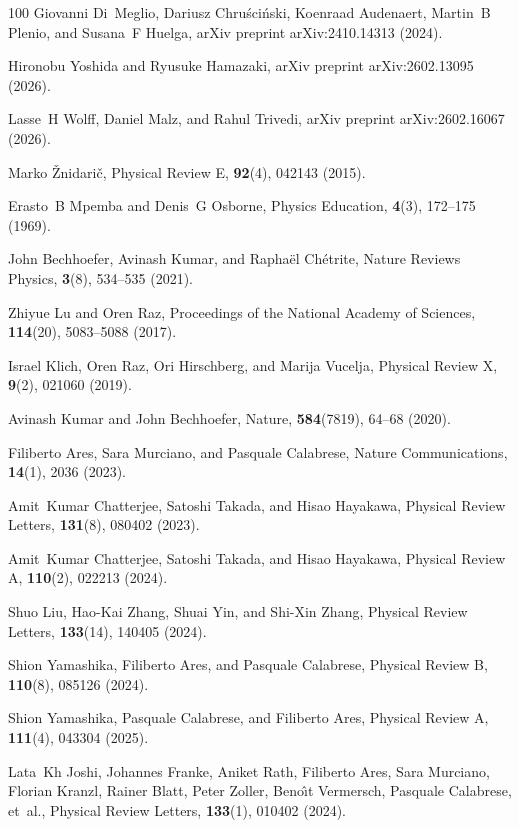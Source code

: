 \documentclass[preprint,pteplogo]{ptephy_v2}%
\numberwithin{equation}{section}
\theoremstyle{definition}
\begin{document}
\begin{thebibliography}{100}
Giovanni Di~Meglio, Dariusz Chru{\'s}ci{\'n}ski, Koenraad Audenaert, Martin~B Plenio, and Susana~F Huelga, arXiv preprint arXiv:2410.14313 (2024).

Hironobu Yoshida and Ryusuke Hamazaki, arXiv preprint arXiv:2602.13095 (2026).

Lasse~H Wolff, Daniel Malz, and Rahul Trivedi, arXiv preprint arXiv:2602.16067 (2026).

Marko {\v{Z}}nidari{\v{c}}, Physical Review E, {\bf 92}(4), 042143 (2015).

Erasto~B Mpemba and Denis~G Osborne, Physics Education, {\bf 4}(3), 172--175 (1969).

John Bechhoefer, Avinash Kumar, and Rapha{\"e}l Ch{\'e}trite, Nature Reviews Physics, {\bf 3}(8), 534--535 (2021).

Zhiyue Lu and Oren Raz, Proceedings of the National Academy of Sciences, {\bf 114}(20), 5083--5088 (2017).

Israel Klich, Oren Raz, Ori Hirschberg, and Marija Vucelja, Physical Review X, {\bf 9}(2), 021060 (2019).

Avinash Kumar and John Bechhoefer, Nature, {\bf 584}(7819), 64--68 (2020).

Filiberto Ares, Sara Murciano, and Pasquale Calabrese, Nature Communications, {\bf 14}(1), 2036 (2023).

Amit~Kumar Chatterjee, Satoshi Takada, and Hisao Hayakawa, Physical Review Letters, {\bf 131}(8), 080402 (2023).

Amit~Kumar Chatterjee, Satoshi Takada, and Hisao Hayakawa, Physical Review A, {\bf 110}(2), 022213 (2024).

Shuo Liu, Hao-Kai Zhang, Shuai Yin, and Shi-Xin Zhang, Physical Review Letters, {\bf 133}(14), 140405 (2024).

Shion Yamashika, Filiberto Ares, and Pasquale Calabrese, Physical Review B, {\bf 110}(8), 085126 (2024).

Shion Yamashika, Pasquale Calabrese, and Filiberto Ares, Physical Review A, {\bf 111}(4), 043304 (2025).

Lata~Kh Joshi, Johannes Franke, Aniket Rath, Filiberto Ares, Sara Murciano, Florian Kranzl, Rainer Blatt, Peter Zoller, Beno{\^\i}t Vermersch, Pasquale Calabrese, et~al., Physical Review Letters, {\bf 133}(1), 010402 (2024).


\end{thebibliography}
\end{document}
